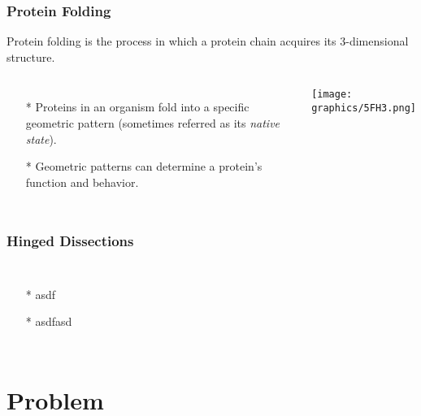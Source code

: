 \documentclass{beamer}
\begin{document}
  \begin{frame}
    \frametitle{Protein Folding}
    Protein folding is the process in which a protein chain acquires its 3-dimensional structure.
    \begin{columns}[c] %
     \begin{itemize}
     	\item[*] Proteins in an organism fold into a specific geometric pattern (sometimes referred as its \textit{native state}).
     	\item[*]  Geometric patterns can determine a protein's function and behavior. 
     \end{itemize}
	     \begin{minipage}{\linewidth}
			\begin{center}
			\texttt{[image: graphics/5FH3.png]}
			\end{center}
		\end{minipage}
    \end{columns}
  \end{frame}

  \begin{frame}
    \frametitle{Hinged Dissections}
     \begin{columns}[c] 
     \begin{itemize}
     	\item[*] asdf
     	\item[*] asdfasd
     \end{itemize}
    \begin{minipage}{\linewidth}
			\begin{center}
			\end{center}
		\end{minipage}
    \end{columns}
  \end{frame}
\section{Problem}
\end{document}
